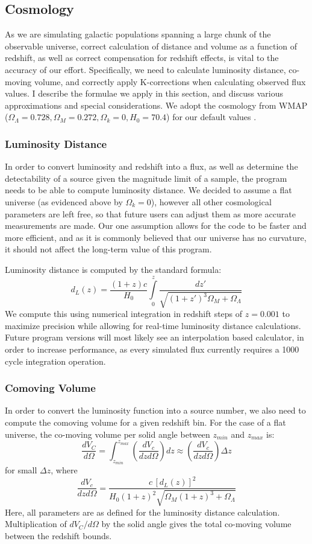 \documentclass[twocolumn,letterpaper,10pt]{article}
\begin{document}
\subsection{Cosmology}

As we are simulating galactic populations spanning a large chunk of the observable universe, correct calculation of distance and volume as a function of redshift, as well as correct compensation for redshift effects, is vital to the accuracy of our effort. Specifically, we need to calculate luminosity distance, co-moving volume, and correctly apply K-corrections when calculating observed flux values. I describe the formulae we apply in this section, and discuss various approximations and special considerations. We adopt the cosmology from WMAP ($\Omega_{\Lambda}=0.728, \Omega_{M}=0.272, \Omega_k=0, H_0=70.4$) for our default values \citep{Komatsu11}.

\subsubsection{Luminosity Distance}
In order to convert luminosity and redshift into a flux, as well as determine the detectability of a source given the magnitude limit of a sample, the program needs to be able to compute luminosity distance. We decided to assume a flat universe (as evidenced above by $\Omega_k=0$), however all other cosmological parameters are left free, so that future users can adjust them as more accurate measurements are made. Our one assumption allows for the code to be faster and more efficient, and as it is commonly believed that our universe has no curvature, it should not affect the long-term value of this program.

Luminosity distance is computed by the standard formula:
$$
d_L(z)=\frac{(1+z)c}{H_0}\int\limits_0^z\frac{dz'}{\sqrt{(1+z')^3\Omega_M+\Omega_\Lambda}}
$$
We compute this using numerical integration in redshift steps of $z=0.001$ to maximize precision while allowing for real-time luminosity distance calculations. Future program versions will most likely see an interpolation based calculator, in order to increase performance, as every simulated flux currently requires a 1000 cycle integration operation.

\subsubsection{Comoving Volume}
In order to convert the luminosity function into a source number, we also need to compute the comoving volume for a given redshift bin. For the case of a flat universe, the co-moving volume per solid angle between $z_{min}$ and $z_{max}$ is:
$$
\frac{dV_C}{d\Omega}=\int_{z_{min}}^{z_{max}}\left(\frac{dV_c}{dz d\Omega}\right)dz\approx \left(\frac{dV_c}{dz d\Omega}\right)\Delta z
$$
for small $\Delta z$, where
$$
\frac{dV_c}{dzd\Omega}=\frac{c\,\left[d_L(z)\right]^2}{H_0 (1+z)^2 \sqrt{\Omega_M(1+z)^3+\Omega_{\Lambda}}}
$$
Here, all parameters are as defined for the luminosity distance calculation. Multiplication of $dV_C/d\Omega$ by the solid angle gives the total co-moving volume between the redshift bounds.
\end{document}
